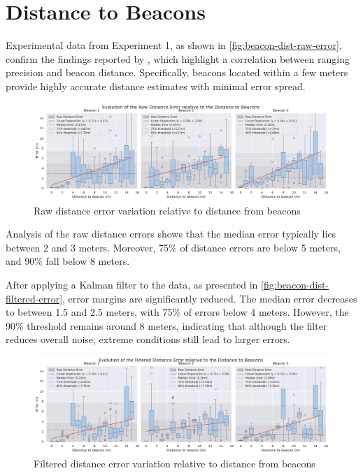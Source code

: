 \section{Distance to Beacons}
Experimental data from Experiment 1, as shown in \autoref{fig:beacon-dist-raw-error}, confirm the findings reported by \cite{spachos_ble_2020}, which highlight a correlation between ranging precision and beacon distance. Specifically, beacons located within a few meters provide highly accurate distance estimates with minimal error spread.

\begin{figure}[h]
    \centering
    \includegraphics[width=\linewidth]{assets/beacon-dist-raw-error-by-beacon.pdf}
    \caption{Raw distance error variation relative to distance from beacons}
    \label{fig:beacon-dist-raw-error}
\end{figure}

Analysis of the raw distance errors shows that the median error typically lies between 2 and 3 meters. Moreover, 75\% of distance errors are below 5 meters, and 90\% fall below 8 meters.

After applying a Kalman filter to the data, as presented in \autoref{fig:beacon-dist-filtered-error}, error margins are significantly reduced. The median error decreases to between 1.5 and 2.5 meters, with 75\% of errors below 4 meters. However, the 90\% threshold remains around 8 meters, indicating that although the filter reduces overall noise, extreme conditions still lead to larger errors.

\begin{figure}[h]
    \centering
    \includegraphics[width=\linewidth]{assets/beacon-dist-filtered-error-by-beacon.pdf}
    \caption{Filtered distance error variation relative to distance from beacons}
    \label{fig:beacon-dist-filtered-error}
\end{figure}

